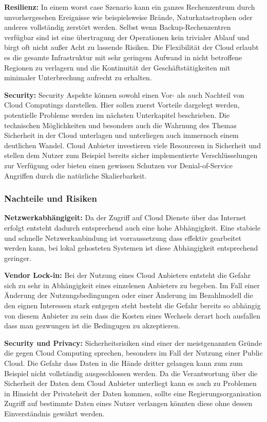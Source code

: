 \textbf{Resilienz:} In einem worst case Szenario kann ein ganzes Rechenzentrum
durch unvorhergesehen Ereignisse wie beispielsweise Brände, Naturkatastrophen
oder anderes vollständig zerstört werden. Selbst wenn Backup-Rechenzentren
verfügbar sind ist eine übertragung der Operationen kein trivialer Ablauf und
birgt oft nicht außer Acht zu lassende Risiken. Die Flexibilität der Cloud
erlaubt es die gesamte Infrastruktur mit sehr geringem Aufwand in nicht
betroffene Regionen zu verlagern und die Kontinuität der Geschäftstätigkeiten
mit minimaler Unterbrechung aufrecht zu erhalten.

\textbf{Security:} Security Aspekte können sowohl einen Vor- als auch Nachteil
von Cloud Computings darstellen. Hier sollen zuerst Vorteile dargelegt werden,
potentielle Probleme werden im nächsten Unterkapitel beschrieben.
Die technischen Möglichkeiten und besonders auch die Wahrnung des Themas
Sicherheit in der Cloud unterlagen und unterliegen auch immernoch einem
deutlichen Wandel. Cloud Anbieter investieren
viele Resourcesn in Sicherheit und stellen dem Nutzer zum Beispiel bereits sicher
implementierte Verschlüsselungen zur Verfügung oder bieten einen gewissen
Schutzen vor Denial-of-Service Angriffen durch die natürliche Skalierbarkeit.\\

\subsubsection{\textbf{Nachteile und Risiken}}

\textbf{Netzwerkabhängigeit:} Da der Zugriff auf Cloud Dienste über das
Internet erfolgt entsteht dadurch entsprechend auch eine hohe Abhängigkeit.
Eine stabiele und schnelle Netzwerkanbindung ist vorraussetzung dass effektiv
gearbeitet werden kann, bei lokal gehosteten Systemen ist diese Abhängigkeit
entsprechend geringer.

\textbf{Vendor Lock-in:} Bei der Nutzung eines Cloud Anbieters entsteht die
Gefahr sich zu sehr in Abhängigkeit eines einzelenen Anbieters zu begeben.
Im Fall einer Änderung der Nutzungsbedingungen oder einer Änderung im
Bezahlmodell die den eignen Interessen stark entgegen steht besteht die Gefahr
bereits so abhängig von diesem Anbieter zu sein dass die Kosten eines Wechsels
derart hoch ausfallen dass man gezwungen ist die Bedingugen zu akzeptieren.

\textbf{Security und Privacy:} Sicherheitsrisiken sind einer der meistgenannten
Gründe die gegen Cloud Computing sprechen, besonders im Fall der Nutzung einer
Public Cloud. Die Gefahr dass Daten in die Hände dritter gelangen kann zum
zum Beispiel nicht vollständig ausgeschlossen werden. Da die Verantwortung über
die Sicherheit der Daten dem Cloud Anbieter unterliegt kann es auch zu Problemen
in Hinsicht der Privateheit der Daten kommen, sollte eine Regierungsorganisation
Zugriff auf bestimmte Daten eines Nutzer verlangen könnten diese ohne dessen
Einverständnis gewährt werden.

